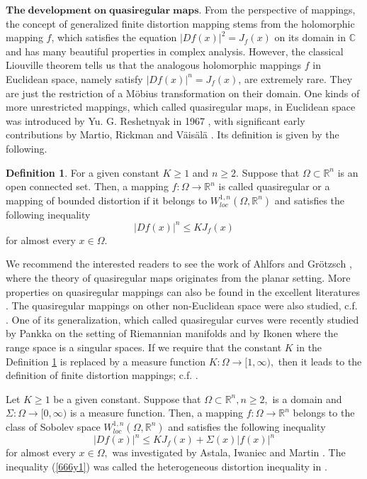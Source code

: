 \documentclass[11pt,twoside]{article}
\theoremstyle{definition}
\newtheorem{defn}{Definition}[section]
\theoremstyle{remark}
\begin{document}
  $\mathbf{The\;development \;on\;quasiregular\;maps}.$ From the perspective of mappings, the concept of generalized finite distortion mapping stems from the holomorphic mapping $f$, which satisfies the equation $\vert Df(x)\vert^{2}=J_{f}(x)$ on its domain in $\mathbb{C}$ and has many beautiful properties in complex analysis.  However, the classical Liouville theorem tells us that the analogous holomorphic mappings $f$ in Euclidean space, namely satisfy $\vert Df(x)\vert^{n}=J_{f}(x)$, are extremely rare. They are just the restriction of a M\"{o}bius transformation on their domain. One kinds of more unrestricted mappings, which called quasiregular maps, in Euclidean space was introduced by Yu. G. Reshetnyak in 1967 \cite{Res67}, with significant early contributions by Martio, Rickman and V\"{a}is\"{a}l\"{a} 
  \cite{MRV69,MRV70,MRV71}. Its definition is given by the following.
  \begin{defn}{\rm\cite{Res67}}\label{019001}
  For a given constant $K\geq1$ and $n\geq2.$ Suppose that $\Omega\subset\mathbb{R}^{n}$  is an open connected set. Then, a mapping $f:\Omega\rightarrow\mathbb{R}^{n}$ is called quasiregular or a mapping of bounded distortion if it belongs to $W_{loc}^{1,n}(\Omega, \mathbb{R}^{n})$ and satisfies the following inequality 
  $$\vert Df(x)\vert^{n}\leq KJ_{f}(x)$$
  for almost every $x\in\Omega.$
  \end{defn}
We recommend the  interested readers to see  the work of  Ahlfors \cite{Ahl35} and  Gr\"{o}tzsch \cite{ Grö28}, where the theory of quasiregular maps originates from the planar setting. More properties on quasiregular mappings can also be found in the excellent literatures \cite{Res89, Ric93, Vuo88}.  The quasiregular mappings on other non-Euclidean space were also studied, c.f. \cite{FLP16, HH97, GW16, GGWX24, OR09}. One of its generalization, which called quasiregular curves were recently studied by Pankka \cite{Pan20} on the setting of Riemannian manifolds and by Ikonen \cite{Iko23} where the range space is a singular spaces. If we require that the constant $K$ in the Definition \ref{019001} is replaced by a measure function $K:\Omega\rightarrow[1,\infty),$  then it leads to the definition of finite distortion mappings; c.f. \cite{HK14, IM01}.


 Let $K\geq1$ be a given constant.  Suppose that $\Omega\subset\mathbb{R}^{n},n\geq2,$  is a domain  and $\Sigma:\Omega\rightarrow[0,\infty)$ is a  measure function. Then, a mapping $f:\Omega\rightarrow\mathbb{R}^{n}$ belongs to the class of Sobolev space $W_{loc}^{1,n}(\Omega, \mathbb{R}^{n})$ and satisfies the following inequality 
 \begin{equation}\label{666y1}
\vert Df(x)\vert^{n}\leq KJ_{f}(x)+\Sigma(x)\vert f(x)\vert^{n}
\end{equation}
  for almost every $x\in\Omega,$ was investigated by Astala, Iwaniec and Martin \cite[Section 8.5]{ATM09}. The inequality  (\ref{666y1}) was called the heterogeneous distortion inequality in \cite{KO221}.
\end{document}
